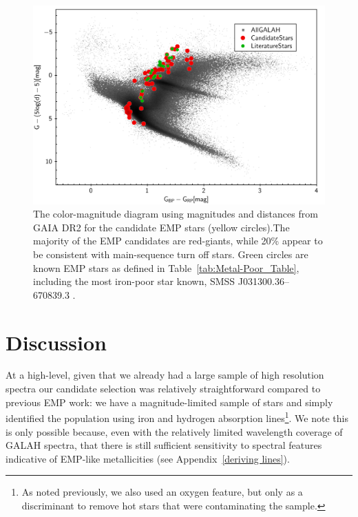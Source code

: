 \documentclass[]{aastex631}
\begin{document}
\begin{figure}
\includegraphics[width=\linewidth]{Plots/Figure12.pdf}
\caption{The color-magnitude diagram using magnitudes and distances from GAIA DR2 for the candidate EMP stars (yellow circles).The majority of the EMP candidates are red-giants, while 20\% appear to be consistent with main-sequence turn off stars. Green circles are known EMP stars as defined in Table~\ref{tab:Metal-Poor_Table}, including the most iron-poor star known, SMSS J031300.36–670839.3  \citep{keller_single_2014}.}
\label{fig:bird_plot}
\end{figure}





\section{Discussion}\label{Sec:Discussion}
At a high-level, given that we already had a large sample of high resolution spectra our candidate selection was relatively straightforward compared to previous EMP work: we have a magnitude-limited sample of stars and simply identified the population using iron and hydrogen absorption lines\footnote{As noted previously, we also used an oxygen feature, but only as a discriminant to remove hot stars that were contaminating the sample.}. We note this is only possible because, even with the relatively limited wavelength coverage of GALAH spectra, that there is still sufficient sensitivity to spectral features indicative of EMP-like metallicities (see Appendix~\ref{deriving lines}).
\end{document}
